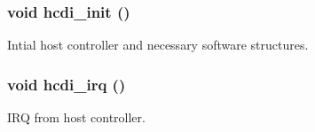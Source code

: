 \subsubsection{\setlength{\rightskip}{0pt plus 5cm}void hcdi\_\-init ()}\label{host_8h_a5e728976c2dc39c8374ddbea42e9864}


Intial host controller and necessary software structures. 
\subsubsection{\setlength{\rightskip}{0pt plus 5cm}void hcdi\_\-irq ()}\label{host_8h_68ce1031b8a7a610ec829f164d6f33cd}


IRQ from host controller. 